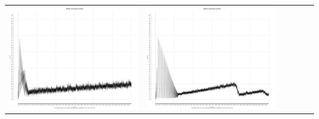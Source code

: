 \begin{table}[htbp]
{\begin{tabular}{l | ccccc}
\begin{minipage}{.15\textwidth}
     			 	\includegraphics[width=\linewidth]{images/mema-triple/I8}
    				 \end{minipage}
    			   &	 \begin{minipage}{.15\textwidth}
     			 	\includegraphics[width=\linewidth]{images/mema-triple/I11}
    				 \end{minipage}
    			   &	 \begin{minipage}{.15\textwidth}

\end{minipage}
\end{tabular}}
\end{table}
